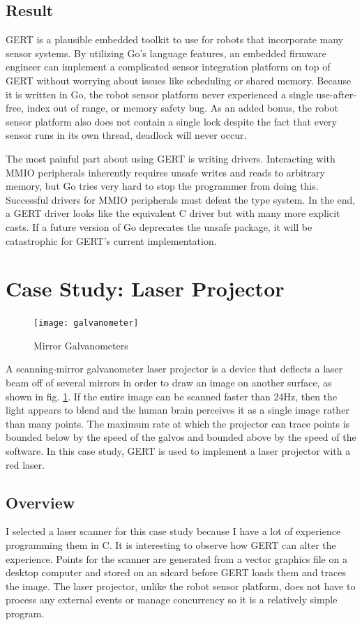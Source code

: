 \subsection{Result}
GERT is a plausible embedded toolkit to use for robots that incorporate many sensor systems.
By utilizing Go's language features, an embedded firmware engineer can implement a complicated sensor integration
platform on top of GERT without worrying about issues like scheduling or shared memory. Because it is written in Go,
the robot sensor platform
never experienced a single use-after-free, index out of range, or memory safety bug.
As an added bonus, the robot sensor platform also does not contain a single lock despite the fact that every sensor
runs in its own thread, deadlock will never occur.

The most painful part about using GERT is writing drivers. Interacting with MMIO
peripherals inherently requires unsafe writes and reads to arbitrary memory, but Go
tries very hard to stop the programmer from doing this. Successful drivers for MMIO
peripherals must defeat the type system. In the end, a GERT driver
looks like the equivalent C driver but with many more explicit casts.
If a future version of Go deprecates the unsafe package, it will be catastrophic for
GERT's current implementation.



\section{Case Study: Laser Projector}\label{sec:laser}
\begin{figure}[h]
\begin{center}
  \texttt{[image: galvanometer]}
\end{center}
  \caption{Mirror Galvanometers} \label{fig:galvos}
\end{figure}

A scanning-mirror galvanometer laser projector is a device that deflects a laser beam off of several mirrors in
order to draw an image on another surface, as shown in fig. \ref{fig:galvos}. If the entire image can be scanned faster than 24Hz, then the light appears
to blend and the human brain perceives it as a single image rather than many points. The maximum rate at which the
projector can trace points is bounded below by the speed of the galvos and bounded above by the speed of the software.
In this case study, GERT is used to implement a laser projector with a red laser.

\subsection{Overview}
I selected a laser scanner for this case study because I have a lot of experience programming
them in C. It is interesting to observe how GERT can alter the experience.
Points for the scanner are generated from a vector graphics file on a desktop computer and stored
on an sdcard before GERT loads them and traces the image. The laser projector,
unlike the robot sensor platform, does not have to process any external events or
manage concurrency so it is a relatively simple program.

